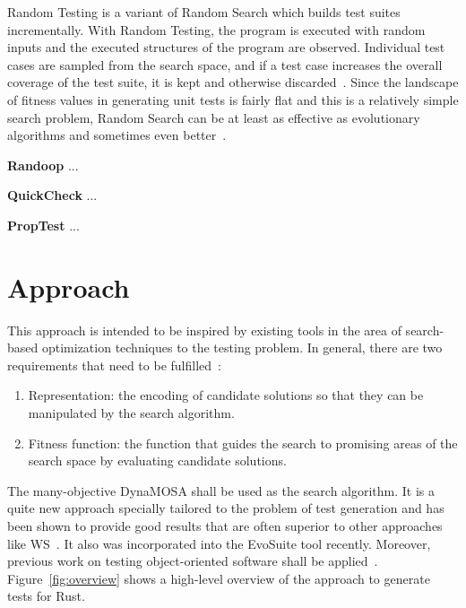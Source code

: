 \documentclass{article}
\begin{document}
Random Testing is a variant of Random Search which builds test suites incrementally. With Random Testing, the program is executed with random inputs and the executed structures of the program are observed. Individual test cases are sampled from the search space, and if a test case increases the overall coverage of the test suite, it is kept and otherwise discarded~\cite{Campos2017}. Since the landscape of fitness values in generating unit tests is fairly flat and this is a relatively simple search problem, Random Search can be at least as effective as evolutionary algorithms and sometimes even better~\cite{Shamshiri2015a}.

\textbf{Randoop} ...

\textbf{QuickCheck} ...

\textbf{PropTest} ...


\section{Approach}
This approach is intended to be inspired by existing tools in the area of search-based optimization techniques to the testing problem. In general, there are two requirements that need to be fulfilled~\cite{Harman2001}:
\begin{enumerate}
    \item Representation: the encoding of candidate solutions so that they can be manipulated by the search algorithm.
    \item Fitness function: the function that guides the search to promising areas of the search space by evaluating candidate solutions.
\end{enumerate}
The many-objective \ac{DynaMOSA} shall be used as the search algorithm. It is a quite new approach specially tailored to the problem of test generation and has been shown to provide good results that are often superior to other approaches like \ac{WS}~\cite{Campos2017}. It also was incorporated into the EvoSuite tool recently. Moreover, previous work on testing object-oriented software shall be applied~\cite{Tonella2004,Fraser2012}. Figure~\ref{fig:overview} shows a high-level overview of the approach to generate tests for Rust. 
\end{document}
